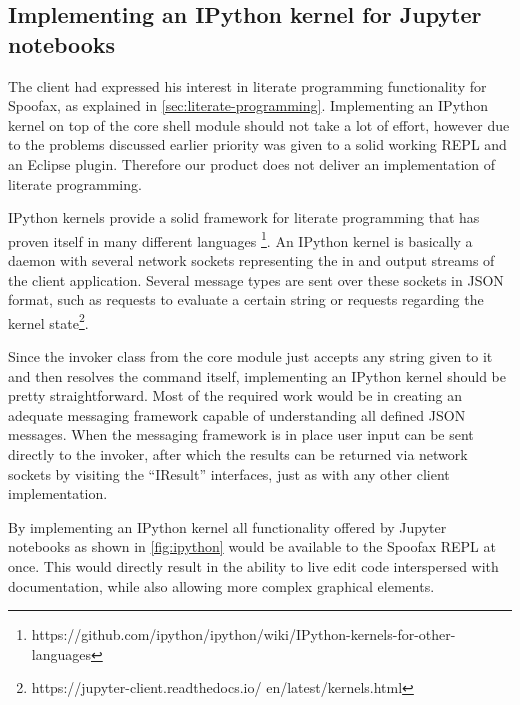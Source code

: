 \subsection{Implementing an IPython kernel for Jupyter notebooks}
\label{sec:discuss-literate-programming}

The client had expressed his interest in literate programming functionality for
Spoofax, as explained in \cref{sec:literate-programming}. Implementing an
IPython kernel on top of the core shell module should not take a lot of effort,
however due to the problems discussed earlier priority was given to a solid
working REPL and an Eclipse plugin. Therefore our product does not deliver an
implementation of literate programming.

IPython kernels provide a solid framework for literate programming that has
proven itself in many different languages%
\footnote{https://github.com/ipython/ipython/wiki/IPython-kernels-for-other-languages}.
An IPython kernel is basically a daemon with several network sockets
representing the in and output streams of the client application. Several
message types are sent over these sockets in JSON format, such as requests to
evaluate a certain string or requests regarding the kernel
state\footnote{https://jupyter-client.readthedocs.io/ en/latest/kernels.html}.

Since the invoker class from the core module just accepts any string given to
it and then resolves the command itself, implementing an IPython kernel should
be pretty straightforward. Most of the required work would be in creating an
adequate messaging framework capable of understanding all defined JSON
messages. When the messaging framework is in place user input can be sent
directly to the invoker, after which the results can be returned via network
sockets by visiting the ``IResult'' interfaces, just as with any other client
implementation.

By implementing an IPython kernel all functionality offered by Jupyter
notebooks as shown in \cref{fig:ipython} would be available to the
Spoofax REPL at once. This would directly result in the ability to live edit
code interspersed with documentation, while also allowing more complex
graphical elements.

